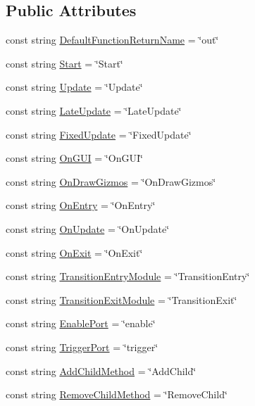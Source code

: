 \subsection*{Public Attributes}
\begin{DoxyCompactItemize}
\item 
const string \hyperlink{classi_c_s___strings_ab22512552fba49e9f4c04438542204a3}{Default\+Function\+Return\+Name} = \char`\"{}out\char`\"{}
\item 
const string \hyperlink{classi_c_s___strings_ae59ad3850449e1893f6052078f71f72f}{Start} = \char`\"{}Start\char`\"{}
\item 
const string \hyperlink{classi_c_s___strings_abb1dc82f4805c6cd053b410e29782c65}{Update} = \char`\"{}Update\char`\"{}
\item 
const string \hyperlink{classi_c_s___strings_a39c61a7a753d26767ef4252f4c246cd0}{Late\+Update} = \char`\"{}Late\+Update\char`\"{}
\item 
const string \hyperlink{classi_c_s___strings_a03d3b1cfbd2659001b3ef9813fcab111}{Fixed\+Update} = \char`\"{}Fixed\+Update\char`\"{}
\item 
const string \hyperlink{classi_c_s___strings_a35d20b736be73c19faa689d8053ce527}{On\+G\+U\+I} = \char`\"{}On\+G\+U\+I\char`\"{}
\item 
const string \hyperlink{classi_c_s___strings_aa2f690070795b5a7068b636b60720427}{On\+Draw\+Gizmos} = \char`\"{}On\+Draw\+Gizmos\char`\"{}
\item 
const string \hyperlink{classi_c_s___strings_a2637e715ce2c4cd40cbe65f4eae17755}{On\+Entry} = \char`\"{}On\+Entry\char`\"{}
\item 
const string \hyperlink{classi_c_s___strings_a026218da4467a77c4c3b83c47f7650ae}{On\+Update} = \char`\"{}On\+Update\char`\"{}
\item 
const string \hyperlink{classi_c_s___strings_ae97b5ddab4435c2867574b26256f873b}{On\+Exit} = \char`\"{}On\+Exit\char`\"{}
\item 
const string \hyperlink{classi_c_s___strings_ab1aa22ad8712151313c2f49998cd5b85}{Transition\+Entry\+Module} = \char`\"{}Transition\+Entry\char`\"{}
\item 
const string \hyperlink{classi_c_s___strings_af84270952763bfdfe88274648fc3e3b9}{Transition\+Exit\+Module} = \char`\"{}Transition\+Exit\char`\"{}
\item 
const string \hyperlink{classi_c_s___strings_a38a4113da16ff7745db56a7079564c4c}{Enable\+Port} = \char`\"{}enable\char`\"{}
\item 
const string \hyperlink{classi_c_s___strings_a4ab12350fb1a94d27d6dd826ab2382f3}{Trigger\+Port} = \char`\"{}trigger\char`\"{}
\item 
const string \hyperlink{classi_c_s___strings_a37059cf9f06e43a62de4efdcd9780315}{Add\+Child\+Method} = \char`\"{}Add\+Child\char`\"{}
\item 
const string \hyperlink{classi_c_s___strings_a8d3674494ffd847453d56c5b385bc1e5}{Remove\+Child\+Method} = \char`\"{}Remove\+Child\char`\"{}
\end{DoxyCompactItemize}


